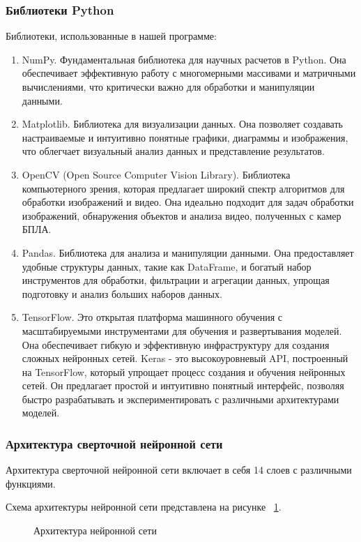 \subsubsection{Библиотеки Python}
Библиотеки, использованные в нашей программе:
\begin{enumerate}
\item NumPy. Фундаментальная библиотека для научных расчетов в Python. Она обеспечивает эффективную работу с многомерными массивами и матричными вычислениями, что критически важно для обработки и манипуляции данными.
\item Matplotlib. Библиотека для визуализации данных. Она позволяет создавать настраиваемые и интуитивно понятные графики, диаграммы и изображения, что облегчает визуальный анализ данных и представление результатов.
\item OpenCV (Open Source Computer Vision Library). Библиотека компьютерного зрения, которая предлагает широкий спектр алгоритмов для обработки изображений и видео. Она идеально подходит для задач обработки изображений, обнаружения объектов и анализа видео, полученных с камер БПЛА.
\item Pandas. Библиотека для анализа и манипуляции данными. Она предоставляет удобные структуры данных, такие как DataFrame, и богатый набор инструментов для обработки, фильтрации и агрегации данных, упрощая подготовку и анализ больших наборов данных.
\item TensorFlow. Это открытая платформа машинного обучения с масштабируемыми инструментами для обучения и развертывания моделей. Она обеспечивает гибкую и эффективную инфраструктуру для создания сложных нейронных сетей. Keras - это высокоуровневый API, построенный на TensorFlow, который упрощает процесс создания и обучения нейронных сетей. Он предлагает простой и интуитивно понятный интерфейс, позволяя быстро разрабатывать и экспериментировать с различными архитектурами моделей.
\end{enumerate}

\subsubsection{Архитектура сверточной нейронной сети}

Архитектура сверточной нейронной сети включает в себя 14 слоев с различными функциями.

Схема архитектуры нейронной сети представлена на рисунке ~\ref{archNC:image}.

\begin{figure}[H]
\caption{Архитектура нейронной сети}
\label{archNC:image}
\end{figure}

